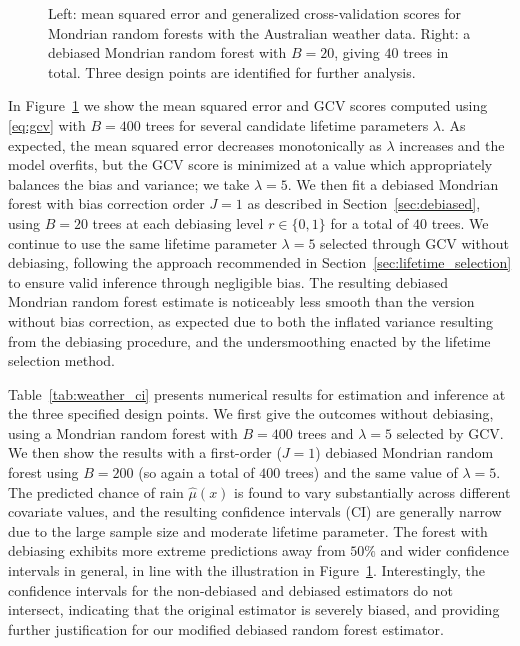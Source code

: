\begin{figure}[t]
\begin{subfigure}{0.49\textwidth}
  \end{subfigure}
  \caption[Cross-validation and debiasing for the Australian weather data]{
    Left: mean squared error and generalized cross-validation scores
    for Mondrian random forests with the Australian weather data.
    Right: a debiased Mondrian random forest with $B=20$, giving $40$ trees
  in total. Three design points are identified for further analysis.}
  \label{fig:weather_gcv}
\end{figure}

In Figure~\ref{fig:weather_gcv} we show the mean squared error and GCV scores
computed using \eqref{eq:gcv} with $B=400$ trees
for several candidate lifetime parameters $\lambda$. As
expected, the mean squared error decreases monotonically
as $\lambda$ increases and the model
overfits, but the GCV score is minimized at a value which appropriately
balances the bias and variance; we take $\lambda = 5$.
We then fit a debiased Mondrian forest
with bias correction order $J = 1$ as described in
Section~\ref{sec:debiased}, using $B=20$ trees at each debiasing level
$r \in \{0, 1\}$ for a total of $40$ trees.
We continue to use the same lifetime parameter
$\lambda = 5$ selected through GCV without debiasing, following the approach
recommended in Section~\ref{sec:lifetime_selection} to ensure valid inference
through negligible bias.
The resulting debiased Mondrian random forest estimate is noticeably
less smooth than the version without bias correction, as expected due to
both the inflated variance resulting from the debiasing procedure,
and the undersmoothing enacted by the lifetime selection method.

Table~\ref{tab:weather_ci} presents numerical results for estimation and
inference at the three specified design points. We first give the outcomes
without debiasing, using a Mondrian random forest with $B = 400$ trees and
$\lambda = 5$ selected by GCV. We then show the results with a first-order
($J=1$) debiased Mondrian random forest using $B = 200$ (so again a total of
$400$ trees) and the same value of $\lambda = 5$. The predicted chance of rain
$\hat\mu(x)$ is found to vary substantially across different covariate values,
and the resulting confidence intervals (CI) are generally narrow due to the
large sample size and moderate lifetime parameter. The forest with debiasing
exhibits more extreme predictions away from $50\%$ and wider confidence
intervals in general, in line with the illustration in
Figure~\ref{fig:weather_gcv}. Interestingly, the confidence intervals for the
non-debiased and debiased estimators do not intersect, indicating that the
original estimator is severely biased, and providing further justification for
our modified debiased random forest estimator.

